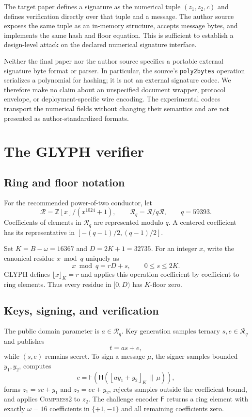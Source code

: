 \documentclass[10pt,a4paper]{article}
\newcommand{\R}{\mathcal{R}}
\newcommand{\Rq}{\mathcal{R}_q}
\newcommand{\Kfloor}[1]{\left\lfloor #1\right\rfloor_K}
\newcommand{\Hash}{\mathsf{H}}
\newcommand{\Encode}{\mathsf{F}}
\begin{document}
The target paper defines a signature as the numerical tuple $(z_1,z_2,c)$ and
defines verification directly over that tuple and a message.  The author
source exposes the same tuple as an in-memory structure, accepts message
bytes, and implements the same hash and floor equation.  This is sufficient
to establish a design-level attack on the declared numerical signature
interface.

Neither the final paper nor the author source specifies a portable external
signature byte format or parser.  In particular, the source's
\texttt{poly2bytes} operation serializes a polynomial for hashing; it is not
an external signature codec.  We therefore make no claim about an unspecified
document wrapper, protocol envelope, or deployment-specific wire encoding.
The experimental codecs transport the numerical fields without changing
their semantics and are not presented as author-standardized formats.

\section{The GLYPH verifier}

\subsection{Ring and floor notation}

For the recommended power-of-two conductor, let
\[
  \R=\mathbb{Z}[x]/(x^{1024}+1),
  \qquad
  \Rq=\R/q\R,
  \qquad q=59393.
\]
Coefficients of elements in $\Rq$ are represented modulo $q$.  A centered
coefficient has its representative in
$[-(q-1)/2,(q-1)/2]$.

Set $K=B-\omega=16367$ and $D=2K+1=32735$.  For an integer $x$, write the
canonical residue $x\bmod q$ uniquely as
\[
  x\bmod q=rD+s,
  \qquad 0\le s\le 2K.
\]
GLYPH defines $\lfloor x\rfloor_K=r$ and applies this operation coefficient
by coefficient to ring elements.  Thus every residue in $[0,D)$ has
$K$-floor zero.

\subsection{Keys, signing, and verification}

The public domain parameter is $a\in\Rq$.  Key generation samples ternary
$s,e\in\Rq$ and publishes
\[
  t=as+e,
\]
while $(s,e)$ remains secret.  To sign a message $\mu$, the signer samples
bounded $y_1,y_2$, computes
\[
  c=\Encode\!\left(\Hash\!\left(
    \Kfloor{ay_1+y_2}\,\|\,\mu
  \right)\right),
\]
forms $z_1=sc+y_1$ and $z_2=ec+y_2$, rejects samples outside the coefficient
bound, and applies \textsc{Compress2} to $z_2$.  The challenge encoder
$\Encode$ returns a ring element with exactly $\omega=16$ coefficients in
$\{+1,-1\}$ and all remaining coefficients zero.
\end{document}
